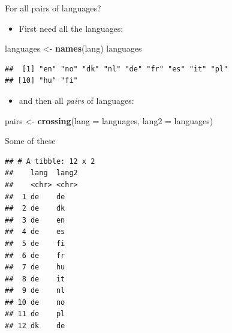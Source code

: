 \documentclass[ignorenonframetext,]{beamer}
\newenvironment{Shaded}{\begin{snugshade}}{\end{snugshade}}
\newcommand{\DataTypeTok}[1]{\textcolor[rgb]{0.13,0.29,0.53}{#1}}
\newcommand{\DecValTok}[1]{\textcolor[rgb]{0.00,0.00,0.81}{#1}}
\newcommand{\KeywordTok}[1]{\textcolor[rgb]{0.13,0.29,0.53}{\textbf{#1}}}
\newcommand{\NormalTok}[1]{#1}
\newcommand{\OperatorTok}[1]{\textcolor[rgb]{0.81,0.36,0.00}{\textbf{#1}}}
\newcommand{\StringTok}[1]{\textcolor[rgb]{0.31,0.60,0.02}{#1}}
\providecommand{\tightlist}{%
  \setlength{\itemsep}{0pt}\setlength{\parskip}{0pt}}
\begin{document}
\begin{frame}[fragile]{For all pairs of languages?}
\protect\hypertarget{for-all-pairs-of-languages}{}

\begin{itemize}
\tightlist
\item
  First need all the languages:
\end{itemize}

\begin{Shaded}
\begin{Highlighting}[]
\NormalTok{languages <-}\StringTok{ }\KeywordTok{names}\NormalTok{(lang)}
\NormalTok{languages}
\end{Highlighting}
\end{Shaded}

\begin{verbatim}
##  [1] "en" "no" "dk" "nl" "de" "fr" "es" "it" "pl"
## [10] "hu" "fi"
\end{verbatim}

\begin{itemize}
\tightlist
\item
  and then all \emph{pairs} of languages:
\end{itemize}

\begin{Shaded}
\begin{Highlighting}[]
\NormalTok{pairs <-}\StringTok{ }\KeywordTok{crossing}\NormalTok{(}\DataTypeTok{lang =}\NormalTok{ languages, }\DataTypeTok{lang2 =}\NormalTok{ languages) }
\end{Highlighting}
\end{Shaded}

\end{frame}

\begin{frame}[fragile]{Some of these}
\protect\hypertarget{some-of-these}{}

\scriptsize

\begin{Shaded}
\end{Shaded}

\begin{verbatim}
## # A tibble: 12 x 2
##    lang  lang2
##    <chr> <chr>
##  1 de    de   
##  2 de    dk   
##  3 de    en   
##  4 de    es   
##  5 de    fi   
##  6 de    fr   
##  7 de    hu   
##  8 de    it   
##  9 de    nl   
## 10 de    no   
## 11 de    pl   
## 12 dk    de
\end{verbatim}

\normalsize

\end{frame}
\end{document}
